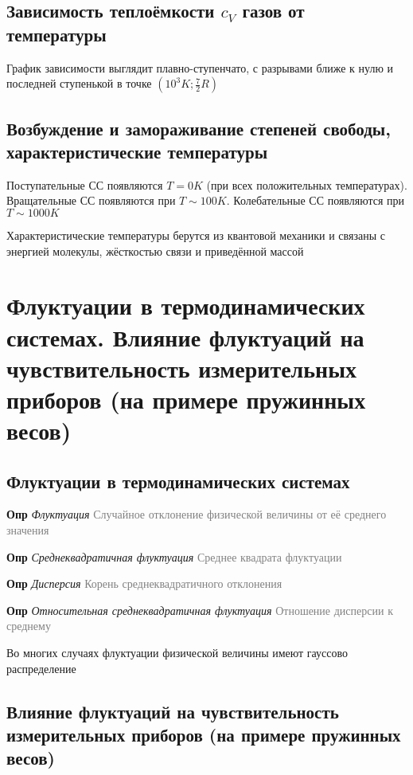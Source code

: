 \documentclass[a4paper, 14pt]{article}
\begin{document}
    \subsection{Зависимость теплоёмкости $c_V$ газов от температуры}
    
    График зависимости выглядит плавно-ступенчато, с разрывами ближе к нулю и последней ступенькой в точке
    $(10^3 K; \frac{7}{2}R)$
    
    \subsection{Возбуждение и замораживание степеней свободы, характеристические температуры}
    
    Поступательные СС появляются $T = 0 K$ (при всех положительных температурах).
    Вращательные СС появляются при $T \sim 100 K$.
    Колебательные СС появляются при $T \sim 1000 K$
    
    Характеристические температуры берутся из квантовой механики и связаны с энергией молекулы, жёсткостью связи и
    приведённой массой
    
    \section{Флуктуации в термодинамических системах.
    Влияние флуктуаций на чувствительность измерительных приборов (на примере пружинных весов)}
    
    \subsection{Флуктуации в термодинамических системах}
    
    \textbf{Опр} \textit{Флуктуация} \textcolor{gray}{Случайное отклонение физической величины от её среднего значения}
    
    \textbf{Опр} \textit{Среднеквадратичная флуктуация} \textcolor{gray}{Среднее квадрата флуктуации}
    
    \textbf{Опр} \textit{Дисперсия} \textcolor{gray}{Корень среднеквадратичного отклонения}
    
    \textbf{Опр} \textit{Относительная среднеквадратичная флуктуация} \textcolor{gray}{Отношение дисперсии к среднему}
    
    Во многих случаях флуктуации физической величины имеют гауссово распределение
    
    \subsection{Влияние флуктуаций на чувствительность измерительных приборов (на примере пружинных весов)}
    
\end{document}
